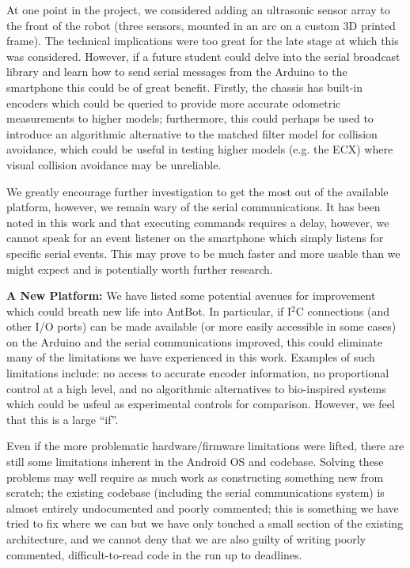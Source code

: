 \documentclass[a4paper,11pt,twoside,openright]{article}
\begin{document}
At one point in the project, we considered adding an ultrasonic sensor
array to the front of the robot (three sensors, mounted in an arc on a
custom 3D printed frame). The technical implications were too great
for the late stage at which this was considered. However, if a future
student could delve into the serial broadcast library and learn how to
send serial messages from the Arduino to the smartphone this could be
of great benefit. Firstly, the chassis has built-in encoders which
could be queried to provide more accurate odometric measurements to
higher models; furthermore, this could perhaps be used to introduce an
algorithmic alternative to the matched filter model for collision
avoidance, which could be useful in testing higher models (e.g. the
ECX) where visual collision avoidance may be unreliable.
\newline\par

We greatly encourage further investigation to get the most out of the
available platform, however, we remain wary of the serial
communications. It has been noted in this work and \cite{Mitchell2018}
that executing commands requires a delay, however, we cannot speak for
an event listener on the smartphone which simply listens for specific
serial events. This may prove to be much faster and more usable than
we might expect and is potentially worth further research.\newline\par



\textbf{A New Platform:} We have listed some potential avenues for
improvement which could breath new life into AntBot. In particular, if
I$^2$C connections (and other I/O ports) can be made available (or
more easily accessible in some cases) on the Arduino and the serial
communications improved, this could eliminate many of the limitations
we have experienced in this work. Examples of such limitations
include: no access to accurate encoder information, no proportional
control at a high level, and no algorithmic alternatives to
bio-inspired systems which could be usfeul as experimental controls
for comparison. However, we feel that this is a large ``if''.
\newline\par

Even if the more problematic hardware/firmware limitations were lifted, there
are still some limitations inherent in the Android OS and codebase.
Solving these problems may well require as much work as constructing
something new from scratch; the existing codebase (including the
serial communications system) is almost entirely undocumented and
poorly commented; this is something we have tried to fix where we can
but we have only touched a small section of the existing architecture,
and we cannot deny that we are also guilty of writing poorly
commented, difficult-to-read code in the run up to deadlines.
\newline\par
\end{document}
